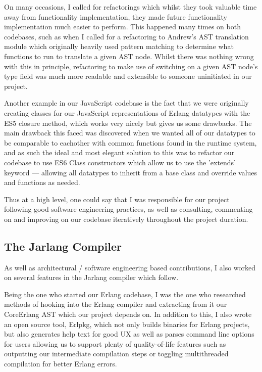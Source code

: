 \documentclass[twoside,12pt,titlepage,a4paper]{article}
\begin{document}
		On many occasions, I called for refactorings which whilst they took valuable time away
		from functionality implementation, they made future functionality implementation much easier to perform. This happened
		many times on both codebases, such as when I called for a refactoring to Andrew's AST translation module which originally
		heavily used pattern matching to determine what functions to run to translate a given AST node. Whilst there was nothing
		wrong with this in principle, refactoring to make use of switching on a given AST node's type field was much more readable
		and extensible to someone uninitiated in our project.

		Another example in our JavaScript codebase is the fact that we were originally creating classes for our JavaScript
		representations of Erlang datatypes with the ES5 closure method, which works very nicely but gives us some drawbacks.
		The main drawback this faced was discovered when we wanted all of our datatypes to be comparable to eachother with common
		functions found in the runtime system, and as such the ideal and most elegant solution to this was to refactor our codebase
		to use ES6 Class constructors which allow us to use the 'extends' keyword --- allowing all datatypes to inherit from a
		base class and override values and functions as needed. 

		Thus at a high level, one could say that I was responsible for our project following good software engineering practices,
		as well as consulting, commenting on and improving on our codebase iteratively throughout the project duration.

	\subsection{The Jarlang Compiler}
		As well as architectural / software engineering based contributions, I also worked on several features in the Jarlang
		compiler which follow.

		Being the one who started our Erlang codebase, I was the one who researched methods of hooking into the Erlang compiler
		and extracting from it our CoreErlang AST which our project depends on. In addition to this, I also wrote an open source
		tool, Erlpkg, which not only builds binaries for Erlang projects, but also generates help text for good UX as well as
		parses command line options for users allowing us to support plenty of quality-of-life features such as outputting
		our intermediate compilation steps or toggling multithreaded compilation for better Erlang errors.
\end{document}
